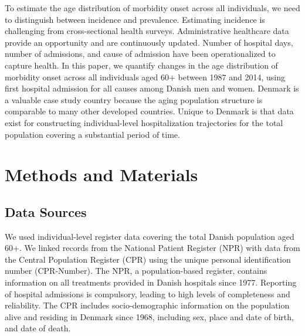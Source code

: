 To estimate the age distribution of morbidity onset across all individuals, 
we need to distinguish between incidence and prevalence.\citep{fries2011compression} 
Estimating incidence is challenging from cross-sectional health 
surveys.\citep{robine1991healthy} Administrative healthcare data provide 
an opportunity and are continuously updated. Number of hospital days, number 
of admissions, and cause of admission have been operationalized to capture 
health.\citep{busse2002use,dixon2004hospital,oksuzyan2013changes,simmonds2014understanding,
hu2018changes,hohn2018sex,luben2016predicting,syddall2016understanding} 
In this paper, we quantify changes in the age distribution of morbidity 
onset across all individuals aged 60+ between 1987 and 2014, using first 
hospital admission for all causes among Danish men and women. Denmark is 
a valuable case study country because the aging population structure is 
comparable to many other developed countries. Unique to Denmark is that 
data exist for constructing individual-level hospitalization trajectories 
for the total population covering a substantial period of time.\citep{schmidt2015danish,
westergaard2019population} \\




\section{Methods and Materials}

\subsection{Data Sources}

We used individual-level register data covering the total Danish population 
aged 60+. We linked records from the National Patient Register (NPR) with 
data from the Central Population Register (CPR) using the unique personal 
identification number (CPR-Number). The NPR, a population-based register, 
contains information on all treatments provided in Danish hospitals since 
1977. Reporting of hospital admissions is compulsory, leading to high levels 
of completeness and reliability. The CPR includes socio-demographic information 
on the population alive and residing in Denmark since 1968, including sex, 
place and date of birth, and date of death.\citep{schmidt2015danish,schmidt2014}\\

